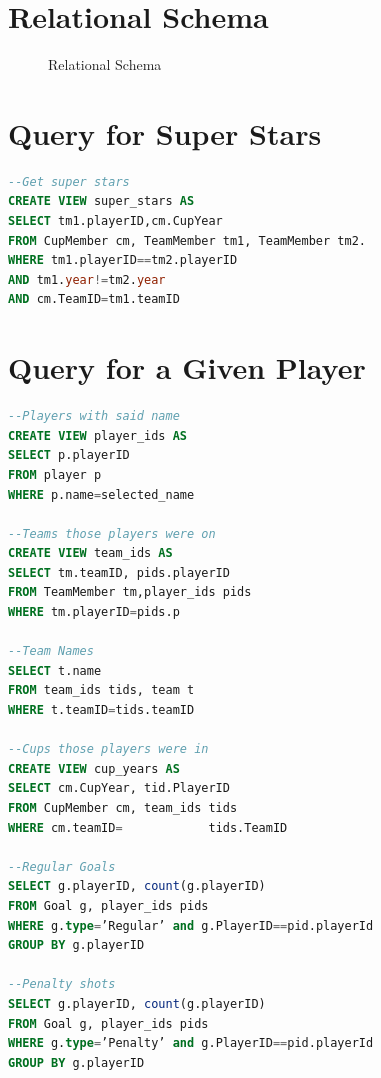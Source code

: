 \documentclass{article}
\begin{document}
\section{Relational Schema}
\begin{figure}[ph]
	\caption{Relational Schema}
	\label{relschema}
\end{figure}

\section{Query for Super Stars}
\begin{lstlisting}[language=SQL]
--Get super stars
CREATE VIEW super_stars AS
SELECT tm1.playerID,cm.CupYear
FROM CupMember cm, TeamMember tm1, TeamMember tm2.
WHERE tm1.playerID==tm2.playerID
AND tm1.year!=tm2.year
AND cm.TeamID=tm1.teamID
\end{lstlisting}

\newpage

\section{Query for a Given Player}
\begin{lstlisting}[language=SQL]
--Players with said name
CREATE VIEW player_ids AS
SELECT p.playerID
FROM player p
WHERE p.name=selected_name

--Teams those players were on
CREATE VIEW team_ids AS
SELECT tm.teamID, pids.playerID
FROM TeamMember tm,player_ids pids
WHERE tm.playerID=pids.p

--Team Names
SELECT t.name
FROM team_ids tids, team t
WHERE t.teamID=tids.teamID

--Cups those players were in
CREATE VIEW cup_years AS
SELECT cm.CupYear, tid.PlayerID
FROM CupMember cm, team_ids tids
WHERE cm.teamID=            tids.TeamID

--Regular Goals
SELECT g.playerID, count(g.playerID)
FROM Goal g, player_ids pids
WHERE g.type=’Regular’ and g.PlayerID==pid.playerId
GROUP BY g.playerID

--Penalty shots
SELECT g.playerID, count(g.playerID)
FROM Goal g, player_ids pids
WHERE g.type=’Penalty’ and g.PlayerID==pid.playerId
GROUP BY g.playerID
\end{lstlisting}
\end{document}

